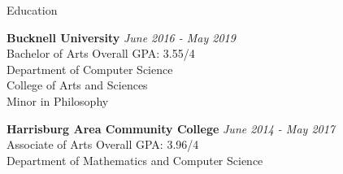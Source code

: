 \documentclass{resume} %
\begin{document}
\begin{rSection}{Education}

{\bf Bucknell University} \hfill {\em June 2016 - May 2019} 
\\ Bachelor of Arts \hfill { Overall GPA: 3.55/4}
\\ Department of Computer Science 
\\ College of Arts and Sciences
\\ Minor in Philosophy 


{\bf Harrisburg Area Community College} \hfill {\em June 2014 - May 2017} 
\\ Associate of Arts \hfill { Overall GPA: 3.96/4}
\\ Department of Mathematics and Computer Science 



\end{rSection}
\end{document}
